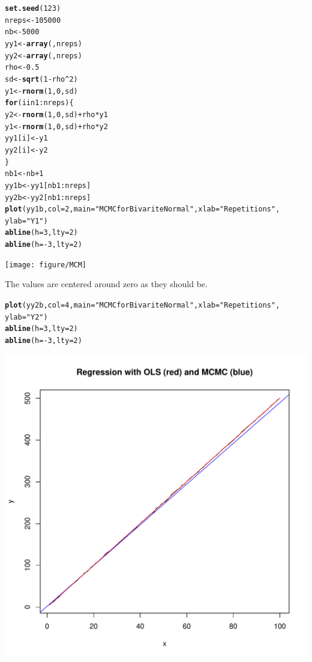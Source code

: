 \documentclass[12pt, a4paper, oneside]{article}\usepackage[]{graphicx}\usepackage[]{color}
\makeatletter
\def\maxwidth{ %
  \ifdim\Gin@nat@width>\linewidth
    \linewidth
  \else
    \Gin@nat@width
  \fi
}
\newcommand{\hlstr}[1]{\textcolor[rgb]{0.192,0.494,0.8}{#1}}%
\newcommand{\hlkwd}[1]{\textcolor[rgb]{0.737,0.353,0.396}{\textbf{#1}}}%
\newenvironment{kframe}{%
 \def\at@end@of@kframe{}%
 \ifinner\ifhmode%
  \def\at@end@of@kframe{\end{minipage}}%
  \begin{minipage}{\columnwidth}%
 \fi\fi%
 \def\FrameCommand##1{\hskip\@totalleftmargin \hskip-\fboxsep
 \colorbox{shadecolor}{##1}\hskip-\fboxsep
     \hskip-\linewidth \hskip-\@totalleftmargin \hskip\columnwidth}%
 \MakeFramed {\advance\hsize-\width
   \@totalleftmargin\z@ \linewidth\hsize
   \@setminipage}}%
 {\par\unskip\endMakeFramed%
 \at@end@of@kframe}
\newenvironment{knitrout}{}{} %
\makeatother
\begin{document}
\begin{knitrout}
\color{fgcolor}\begin{kframe}
\begin{alltt}
\hlkwd{set.seed}(123)
nreps <- 105000
nb <- 5000
yy1 <- \hlkwd{array}(, nreps)
yy2 <- \hlkwd{array}(, nreps)
rho <- 0.5
sd <- \hlkwd{sqrt}(1 - rho^2)
y1 <- \hlkwd{rnorm}(1, 0, sd)
\hlkwd{for} (i in 1:nreps) \{
    y2 <- \hlkwd{rnorm}(1, 0, sd) + rho * y1
    y1 <- \hlkwd{rnorm}(1, 0, sd) + rho * y2
    yy1[i] <- y1
    yy2[i] <- y2
\}
nb1 <- nb + 1
yy1b <- yy1[nb1:nreps]
yy2b <- yy2[nb1:nreps]
\hlkwd{plot}(yy1b, col = 2, main = \hlstr{"MCMC for Bivarite Normal"}, xlab = \hlstr{"Repetitions"}, 
    ylab = \hlstr{"Y1"})
\hlkwd{abline}(h = 3, lty = 2)
\hlkwd{abline}(h = -3, lty = 2)
\end{alltt}
\end{kframe}
\texttt{[image: figure/MCM]} 

\end{knitrout}

The values are centered around zero as they should be. 
\begin{knitrout}
\color{fgcolor}\begin{kframe}
\begin{alltt}
\hlkwd{plot}(yy2b, col = 4, main = \hlstr{"MCMC for Bivarite Normal"}, xlab = \hlstr{"Repetitions"}, 
    ylab = \hlstr{"Y2"})
\hlkwd{abline}(h = 3, lty = 2)
\hlkwd{abline}(h = -3, lty = 2)
\end{alltt}
\end{kframe}
\includegraphics[width=\maxwidth]{figure/MCMC2} 

\end{knitrout}
\end{document}
